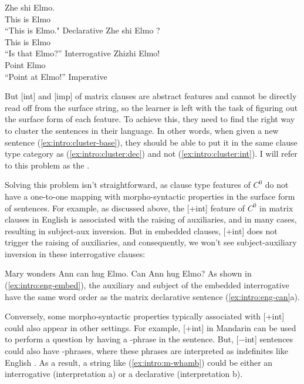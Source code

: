 \bxl
\gll Zhe shi Elmo.\\
This is Elmo\\
\trans ``This is Elmo." \hfill Declarative
\ex 
\gll Zhe shi Elmo ?\\
This is Elmo \Sfp\\
\trans ``Is that Elmo?'' \hfill Interrogative
\ex 
\gll Zhizhi Elmo!\\
Point Elmo\\
\trans ``Point at Elmo!'' \hfill Imperative
\exl
\eex


But [\textpm int] and [imp] of matrix clauses are abstract features and cannot be directly read off from the surface string, so the learner is left with the task of figuring out the surface form of each feature. To achieve this, they need to find the right way to cluster the sentences in their language. In other words, when given a new sentence (\ref{ex:intro:cluster-base}), they should be able to put it in the same clause type category as (\ref{ex:intro:cluster:dec}) and not (\ref{ex:intro:cluster:int}). I will refer to this problem as the . 

Solving this problem isn't straightforward, as clause type features of $C^{0}$ do not have a one-to-one mapping with morpho-syntactic properties in the surface form of sentences. For example, as discussed above, the [+int] feature of $C^{0}$ in matrix clauses in English is associated with the raising of auxiliaries, and in many cases, resulting in subject-aux inversion. But in embedded clauses, [+int] does not trigger the raising of auxiliaries, and consequently, we won't see subject-auxiliary inversion in these interrogative clauses: %

Mary wonders 
\eex
{}
\bxl
Ann can hug Elmo.
\ex Can Ann hug Elmo?
\exl
\eex
As shown in (\ref{ex:intro:eng-embed}), the auxiliary  and subject  of the embedded interrogative have the same word order as the matrix declarative sentence (\ref{ex:intro:eng-can}a).


Conversely, some morpho-syntactic properties typically associated with [+int] could also appear in other settings. For example, [+int] in Mandarin can be used to perform a question by having a \twh-phrase in the sentence. But, [$-$int] sentences could also have \twh-phrases, where these phrases are interpreted as indefinites like English . As a result, a string like (\ref{ex:intro:m-whamb}) could be either an interrogative (interpretation a) or a declarative (interpretation b). 


